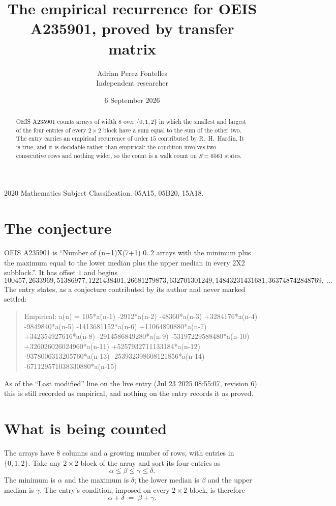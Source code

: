 \documentclass[11pt,a4paper]{article}
\title{The empirical recurrence for OEIS A235901, proved by transfer matrix}
\author{Adrian Perez Fontelles\\ \small Independent researcher}
\date{6 September 2026}
\theoremstyle{plain}
\theoremstyle{definition}
\begin{document}
\maketitle

\begin{abstract}
OEIS A235901 counts arrays of width $8$ over $\{0,1,2\}$ in which the smallest and largest of the
four entries of every $2\times2$ block have a sum equal to the sum of the other two. The entry
carries an empirical recurrence of order $15$ contributed by R.~H.~Hardin. It is true, and
it is decidable rather than empirical: the condition involves two consecutive rows and nothing
wider, so the count is a walk count on $S=6561$ states.
\end{abstract}

\noindent\small 2020 Mathematics Subject Classification. 05A15, 05B20, 15A18.\normalsize

\section{The conjecture}

OEIS A235901 is ``Number of (n+1)X(7+1) 0..2 arrays with the minimum plus the maximum equal to the lower median plus the upper median in every 2X2 subblock.''. It has offset $1$ and begins
\[
100457, 2633969, 51386977, 1221438401, 26681279873, 632701301249, 14843231431681, 363748742848769,\ \dots
\]
The entry states, as a conjecture contributed by its author and never marked settled:
\begin{quote}
Empirical: a(n) = 105*a(n-1) -2912*a(n-2) -48360*a(n-3) +3284176*a(n-4) -9849840*a(n-5) -1413681152*a(n-6) +11064890880*a(n-7) +342354927616*a(n-8) -2914586849280*a(n-9) -53197229588480*a(n-10) +326026026024960*a(n-11) +5257932711133184*a(n-12) -9378006313205760*a(n-13) -253932398608121856*a(n-14) -671129571038330880*a(n-15)
\end{quote}
As of the ``Last modified'' line on the live entry (Jul 23 2025 08:55:07, revision 6) this is still
recorded as empirical, and nothing on the entry records it as proved.

\section{What is being counted}

The arrays have $8$ columns and a growing number of rows, with entries in $\{0,1,2\}$. Take any
$2\times2$ block of the array and sort its four entries as
\[
\alpha\le\beta\le\gamma\le\delta .
\]
The minimum is $\alpha$ and the maximum is $\delta$; the lower median is $\beta$ and the upper
median is $\gamma$. The entry's condition, imposed on every $2\times2$ block, is therefore
\[
\alpha+\delta\;=\;\beta+\gamma .
\]
\end{document}

